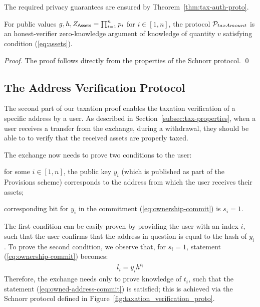 The required privacy guarantees are ensured by Theorem~\ref{thm:tax-auth-proto}.

\begin{theorem}\label{thm:tax-auth-proto}
    For public values $g, h, Z_{\mathsf{Assets}} = \prod_{i = 1}^n p_i$ for $i \in [1,
    n]$, the protocol $\mathcal{P}_{taxAmount}$ is an honest-verifier zero-knowledge
    argument of knowledge of quantity $v$ satisfying condition (\ref{eq:assets}).
\end{theorem}
\begin{proof}
    The proof follows directly from the properties of the Schnorr protocol.
    \qed
\end{proof}

\subsection{The Address Verification Protocol}\label{subsec:user-verification-proto}

The second part of our taxation proof enables the taxation verification of a
specific address by a user. As described in Section~\ref{subsec:tax-properties}, when a
user receives a transfer from the exchange, \eg during a withdrawal, they
should be able to to verify that the received assets are properly taxed.

The exchange now needs to prove two conditions to the user:
\begin{inparaenum}[i)]
    \item for some $i \in [1, n]$, the public key $y_i$ (which is published as
        part of the Provisions scheme) corresponds to the address from which
        the user receives their assets;
    \item corresponding bit for $y_i$ in the commitment
        (\ref{eq:ownership-commit}) is $s_i = 1$.
\end{inparaenum}
The first condition can be easily proven by providing the user with an index
$i$, such that the user confirms that the address in question is equal to the
hash of $y_i$. To prove the second condition, we observe that, for $s_i = 1$,
statement (\ref{eq:ownership-commit}) becomes:
\begin{align}
    l_i = y_ih^{t_i} \label{eq:owned-address-commit}
\end{align}
Therefore, the exchange needs only to prove knowledge of $t_i$, such that the
statement (\ref{eq:owned-address-commit}) is satisfied; this is achieved via
the Schnorr protocol defined in Figure~\ref{fig:taxation_verification_proto}.

